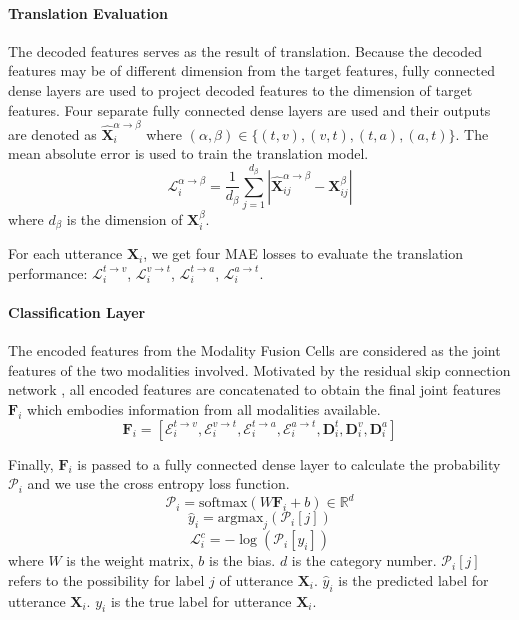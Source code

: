 \documentclass[sigconf]{acmart}
\begin{document}
	\paragraph{Translation Evaluation}
	The decoded features serves as the result of translation. Because the decoded features may be of different dimension from the target features, fully connected dense layers are used to project decoded features to the dimension of target features. Four separate fully connected dense layers are used and their outputs are denoted as $\hat{\mathbf{X}}^{\alpha \to \beta}_i$ where $(\alpha, \beta) \in \{(t,v),(v,t),(t,a),(a,t)\}$. The mean absolute error is used to train the translation model.
	\begin{equation}
	\mathcal{L}^{\alpha \to \beta}_i = \frac{1}{d_{\beta}} \sum_{j=1}^{d_{\beta}} \left| \hat{\mathbf{X}}^{\alpha \to \beta}_{ij} - \mathbf{X}^{\beta}_{ij} \right|
	\end{equation}
	where $d_{\beta}$ is the dimension of $\mathbf{X}^{\beta}_i$.
	
	For each utterance $\mathbf{X}_i$, we get four MAE losses to evaluate the translation performance: $\mathcal{L}^{t \to v}_i$, $\mathcal{L}^{v \to t}_i$, $\mathcal{L}^{t \to a}_i$, $\mathcal{L}^{a \to t}_i$.
	
	\paragraph{Classification Layer}
	The encoded features from the Modality Fusion Cells are considered as the joint features of the two modalities involved. Motivated by the residual skip connection network \cite{he2016deep}, all encoded features are concatenated to obtain the final joint features $\mathbf{F}_i$ which embodies information from all modalities available.
	\begin{equation}
	\mathbf{F}_i = [\mathcal{E}^{t \to v}_i, \mathcal{E}^{v \to t}_i, \mathcal{E}^{t \to a}_i, \mathcal{E}^{a \to t}_i, \mathbf{D}^t_i, \mathbf{D}^v_i, \mathbf{D}^a_i]
	\end{equation}
	
	Finally, $\mathbf{F}_i$ is passed to a fully connected dense layer to calculate the probability $\mathcal{P}_i$ and we use the cross entropy loss function.
	\begin{equation}
	\mathcal{P}_i = \mathrm{softmax}(W\mathbf{F}_i+b) \in \mathbb{R}^{d}
	\end{equation}
	\begin{equation}
	\hat{y}_i = \mathrm{argmax}_j(\mathcal{P}_i[j])
	\end{equation}
	\begin{equation}
	\mathcal{L}^{c}_i = -\log(\mathcal{P}_i[y_i])
	\end{equation}
	where $W$ is the weight matrix, $b$ is the bias. $d$ is the category number. $\mathcal{P}_i[j]$ refers to the possibility for label $j$ of utterance $\mathbf{X}_i$. $\hat{y}_i$ is the predicted label for utterance $\mathbf{X}_i$. $y_i$ is the true label for utterance $\mathbf{X}_i$.
	
\end{document}
